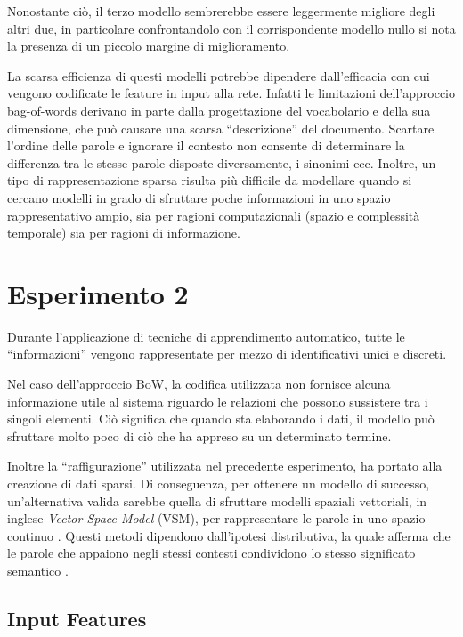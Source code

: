 Nonostante ciò, il terzo modello sembrerebbe essere leggermente migliore degli altri due, in particolare confrontandolo con il corrispondente modello nullo si nota la presenza di un piccolo margine di miglioramento.

La scarsa efficienza di questi modelli potrebbe dipendere dall'efficacia con cui vengono codificate le feature in input alla rete. 
Infatti le limitazioni dell'approccio bag-of-words derivano in parte dalla progettazione del vocabolario e della sua dimensione, che può causare una scarsa ``descrizione'' del documento. 
Scartare l'ordine delle parole e ignorare il contesto non consente di determinare la differenza tra le stesse parole disposte diversamente, i sinonimi ecc.
Inoltre, un tipo di rappresentazione sparsa risulta più difficile da modellare quando si cercano modelli in grado di sfruttare poche informazioni in uno spazio rappresentativo ampio, sia per ragioni computazionali (spazio e complessità temporale) sia per ragioni di informazione.

\section{Esperimento 2}
\label{sec:es2}

Durante l'applicazione di tecniche di apprendimento automatico, tutte le ``informazioni'' vengono rappresentate per mezzo di identificativi unici e discreti. 

Nel caso dell'approccio {BoW}, la codifica utilizzata non fornisce alcuna informazione utile al sistema riguardo le relazioni che possono sussistere tra i singoli elementi. Ciò significa che quando sta elaborando i dati, il modello può sfruttare molto poco di ciò che ha appreso su un determinato termine. 

Inoltre la ``raffigurazione'' utilizzata nel precedente esperimento, ha portato alla creazione di dati sparsi. Di conseguenza, per ottenere un modello di successo, un'alternativa valida sarebbe quella di sfruttare {modelli spaziali vettoriali}, in inglese \emph{Vector Space Model} (VSM), per rappresentare le parole in uno spazio continuo \cite{mikolov2013linguistic,erk2008structured}.
Questi metodi dipendono dall'ipotesi distributiva, la quale afferma che le parole che appaiono negli stessi contesti condividono lo stesso significato semantico \cite{baroni2014don}. 

\subsection{Input Features}
\label{subsec:features2}

